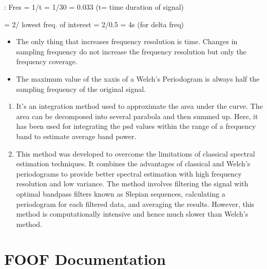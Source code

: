\documentclass[letterpaper,10pt,english]{sphinxmanual}
\begin{document}
\sphinxAtStartPar
{}: Fres = 1/t = 1/30 = 0.033 (t= time duration of signal)

\sphinxAtStartPar
{} = 2/ lowest freq. of interest = 2/0.5 = 4s (for delta freq)

\sphinxAtStartPar
{}
\begin{itemize}
\item {} 
\sphinxAtStartPar
The only thing that increases frequency resolution is time. Changes in sampling frequency do not increase the frequency resolution but only the frequency coverage.

\item {} 
\sphinxAtStartPar
The maximum value of the x\sphinxhyphen{}axis of a Welch’s Periodogram is always half the sampling frequency of the original signal.

\end{itemize}
\begin{enumerate}
%
\setcounter{enumi}{3}
\item {} 
\sphinxAtStartPar
{} It’s an integration method used to approximate the area under the curve. The area can be decomposed into several parabola and then summed up. Here, it has been used for integrating the psd values within the range of a frequency band to estimate average band power.

\item {} 
\sphinxAtStartPar
{} This method was developed to overcome the limitations of classical spectral estimation techniques. It combines the advantages of classical and Welch’s periodograms to provide better spectral estimation with high frequency resolution and low variance. The method involves filtering the signal with optimal bandpass filters known as Slepian sequences, calculating a periodogram for each filtered data, and averaging the results. However, this method is computationally intensive and hence much slower than Welch’s method.

\end{enumerate}


\section{FOOF Documentation}
\label{\detokenize{summary:foof-documentation}}
\sphinxAtStartPar
{}
\end{document}
